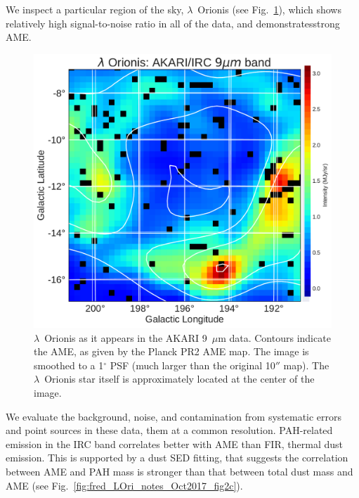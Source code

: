 \documentclass[12pt,a4paper]{article}
\begin{document}
We inspect a particular region of the sky, $\lambda$~Orionis (see Fig.~\ref{fig:orionis-akari9}), which shows relatively high signal-to-noise ratio in all of the data, and demonstratesstrong AME.
  \begin{figure}[h]
    \includegraphics[width=\textwidth/2]{../Plots/LOri_akari9_AMEcont_1dres.pdf}
    \centering
    \caption{\small $\lambda$~Orionis as it appears in the AKARI 9~$\mu$m data. Contours indicate the AME, as given by the Planck PR2 AME map. The image is smoothed to a 1$^{\circ}$ PSF (much larger than the original 10$''$ map). The $\lambda$~Orionis star itself is approximately located at the center of the image.}
    \label{fig:orionis-akari9}
  \end{figure}
We evaluate the background, noise, and contamination from systematic errors and point sources in these data, them at a common resolution. PAH-related emission in the IRC band correlates better with AME than FIR, thermal dust emission. This is supported by a dust SED fitting, that suggests the correlation between AME and PAH mass is stronger than that between total dust mass and AME (see Fig.~\ref{fig:fred_LOri_notes_Oct2017_fig2c}).
\end{document}
